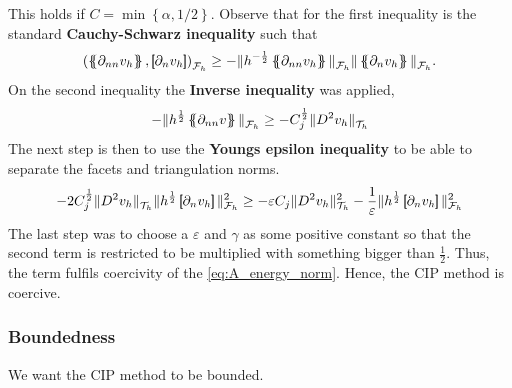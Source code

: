 This holds if $C=\min\left\{  \alpha , 1 /2\right\}$.
Observe that for the first inequality is the standard \textbf{Cauchy-Schwarz inequality} such that $$\left( \mean{ \partial_{nn} v_{h} }  , \jump{ \partial _{n} v_{h} }   \right) _{\mathcal{F} _{h}} \ge - \| h^{-\frac{1}{2}} \mean{ \partial _{nn}
v_{h} }    \|_{\mathcal{F}_{h}   }^{  } \| \mean{ \partial _{n}v_{h} }   \|_{ \mathcal{F}_{h}   }^{  } .  $$ On the second inequality the \textbf{Inverse inequality} was applied,
\[
- \| h^{\frac{1}{2}} \left\{\!\!\left\{ \partial _{nn}v \right\}\!\!\right\}   \|_{ \mathcal{F} _{h}  }^{  }\ge - C_{j}^{\frac{1}{2}} \| D ^2 v_{h} \|_{ \mathcal{T} _{h} }^{  }
\]
The next step is then to use the \textbf{Youngs epsilon inequality} to be able to separate the facets and triangulation norms. \[
 - 2 C^{\frac{1}{2}}_{j} \|  D ^2 v_{h}    \|_{ \mathcal{T} _{h}  }^{  } \| h^{\frac{1}{2}} \jump{ \partial _{n} v_{h} }   \|_{ \mathcal{F} _{h} }^{2  } \ge- \varepsilon C_{j} \| D ^2 v_{h} \|_{ \mathcal{T} _{h} }^{2  } -
 \frac{1}{\varepsilon } \| h^{\frac{1}{2}} \jump{ \partial _{n} v_{h} }   \|_{ \mathcal{F} _{h} }^{2  }
\]
The last step was to choose a $\varepsilon $ and $\gamma $ as some positive constant so that the second term is restricted to be multiplied with something bigger than $\frac{1}{2}$. Thus, the term fulfils coercivity of the \eqref{eq:A_energy_norm}.
Hence, the CIP method is coercive.

\subsubsection{Boundedness}%
\label{ssub:bounded}
We want the CIP method to be bounded.



